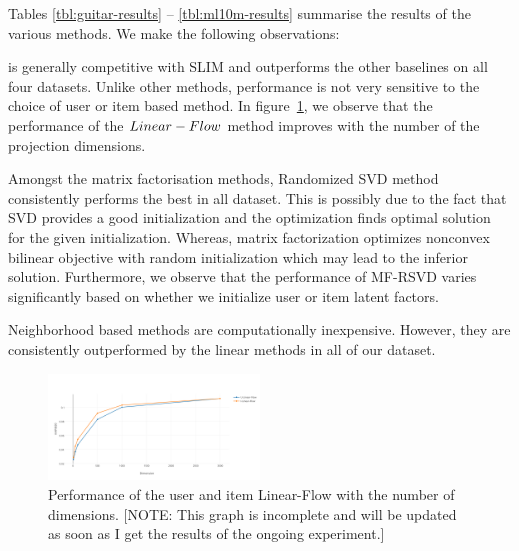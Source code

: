 Tables \ref{tbl:guitar-results} -- \ref{tbl:ml10m-results} summarise the results of the various methods.
We make the following observations:
\begin{compactitem}

\item \LinearLow is generally competitive with SLIM and outperforms the other baselines on all four datasets. Unlike other methods, \LinearLow performance is not very sensitive to the choice of user or item based method. In figure~\ref{fig:dimensionPerformance}, we observe that the performance of the $Linear-Flow$ method improves with the number of the projection dimensions. 

\item Amongst the matrix factorisation methods, Randomized SVD method~\citep{Tang:2013} consistently performs the best in all dataset. This is possibly due to the fact that SVD provides a good initialization and the optimization finds optimal solution for the given initialization. Whereas, matrix factorization optimizes nonconvex bilinear objective with random initialization which may lead to the inferior solution. Furthermore, we observe that the performance of MF-RSVD varies significantly based on whether we initialize user or item latent factors.

\item Neighborhood based methods are computationally inexpensive. However, they are consistently outperformed by the linear methods in all of our dataset.  

\end{compactitem}

\begin{figure}[!ht]
 
  \caption{Performance of the user and item Linear-Flow with the number of dimensions. [NOTE: This graph is incomplete and will be updated as soon as I get the results of the ongoing experiment.]}
  \label{fig:dimensionPerformance}

  \centering
    \includegraphics[width=0.5\textwidth]{imgs/mapvsdim}
\end{figure}

